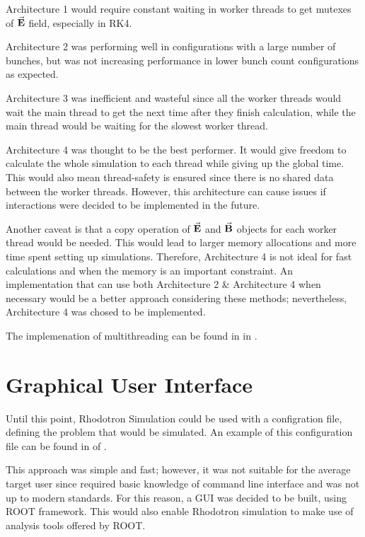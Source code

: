 \documentclass[a4paper,oneside,12pt]{report}
\numberwithin{equation}{chapter}
\begin{document}
{Architecture 1 would require constant waiting in worker threads to get mutexes of $\vec{\textbf{E}}$ field, especially in RK4.

Architecture 2 was performing well in configurations with a large number of bunches, but was not increasing performance in lower bunch count configurations as expected.

Architecture 3 was inefficient and wasteful since all the worker threads would wait the main thread to get the next time after they finish calculation, while the main thread would be waiting for the slowest worker thread.

Architecture 4 was thought to be the best performer. It would give freedom to calculate the whole simulation to each thread while giving up the global time.
This would also mean thread-safety is ensured since there is no shared data between the worker threads. 
However, this architecture can cause issues if \ee interactions were decided to be implemented in the future.

Another caveat is that a copy operation of $\vec{\textbf{E}}$ and $\vec{\textbf{B}}$ objects for each worker thread would be needed.
This would lead to larger memory allocations and more time spent setting up simulations. 
Therefore, Architecture 4 is not ideal for fast calculations and when the memory is an important constraint.
An implementation that can use both Architecture 2 \& Architecture 4 when necessary would be a better approach considering these methods;
nevertheless, Architecture 4 was chosed to be implemented.

The implemenation of multithreading can be found in  in .



\section{Graphical User Interface}

Until this point, Rhodotron Simulation could be used with a configration file, defining the problem that would be simulated.
An example of this configuration file can be found in  of . 

This approach was simple and fast; however, it was not suitable for the average target user since required basic knowledge of command line interface and was not up to modern standards.
For this reason, a GUI was decided to be built, using ROOT framework. 
This would also enable Rhodotron simulation to make use of analysis tools offered by ROOT.

}
\end{document}
